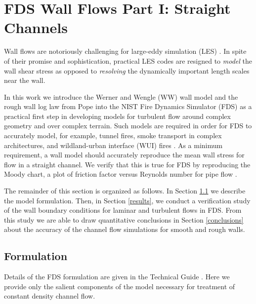 \documentclass[11pt]{book}
\begin{document}
\clearpage

\section{FDS Wall Flows Part I: Straight Channels}
\label{fds_wall_flows1}

Wall flows are notoriously challenging for large-eddy simulation (LES) \cite{Baggett:1997,Baggett:1998,Cabot:1995,Pope:2000,Sagaut:2001}.  In spite of their promise and sophistication, practical LES codes are resigned to \emph{model} the wall shear stress as opposed to \emph{resolving} the dynamically important length scales near the wall.

In this work we introduce the Werner and Wengle (WW) wall model \cite{Werner:1991} and the rough wall log law from Pope \cite{Pope:2000} into the NIST Fire Dynamics Simulator (FDS) as a practical first step in developing models for turbulent flow around complex geometry and over complex terrain.  Such models are required in order for FDS to accurately model, for example, tunnel fires, smoke transport in complex architectures, and wildland-urban interface (WUI) fires \cite{WUI}. As a minimum requirement, a wall model should accurately reproduce the mean wall stress for flow in a straight channel.  We verify that this is true for FDS by reproducing the Moody chart, a plot of friction factor versus Reynolds number for pipe flow \cite{Moody:1944}.

The remainder of this section is organized as follows. In Section \ref{formulation} we describe the model formulation. Then, in Section \ref{results}, we conduct a verification study of the wall boundary conditions for laminar and turbulent flows in FDS.  From this study we are able to draw quantitative conclusions in Section \ref{conclusions} about the accuracy of the channel flow simulations for smooth and rough walls.

\subsection{Formulation}
\label{formulation}

Details of the FDS formulation are given in the Technical Guide \cite{FDS_Math_Guide_5}.  Here we provide only the salient components of the model necessary for treatment of constant density channel flow.
\end{document}

